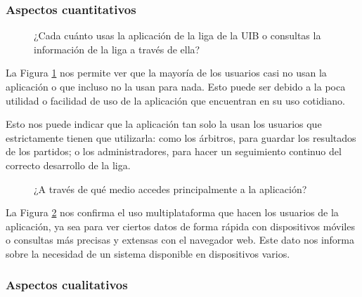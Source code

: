 \subsubsection*{Aspectos cuantitativos}

\begin{figure}[htbp]
    \centering
    \caption{¿Cada cuánto usas la aplicación de la liga de la UIB o consultas la información de la liga a través de ella?}
    \label{fig:col_use}
\end{figure}

La Figura \ref{fig:col_use} nos permite ver que la mayoría de los usuarios casi no usan la aplicación o que incluso no la usan para nada. Esto puede ser debido a la poca utilidad o facilidad de uso de la aplicación que encuentran en su uso cotidiano.

Esto nos puede indicar que la aplicación tan solo la usan los usuarios que estrictamente tienen que utilizarla: como los árbitros, para guardar los resultados de los partidos; o los administradores, para hacer un seguimiento continuo del correcto desarrollo de la liga.

\begin{figure}[htbp]
    \centering
    \caption{¿A través de qué medio accedes principalmente a la aplicación?}
    \label{fig:col_device}
\end{figure}

La Figura \ref{fig:col_device} nos confirma el uso multiplataforma que hacen los usuarios de la aplicación, ya sea para ver ciertos datos de forma rápida con dispositivos móviles o consultas más precisas y extensas con el navegador web. Este dato nos informa sobre la necesidad de un sistema disponible en dispositivos varios.

\subsubsection*{Aspectos cualitativos}

